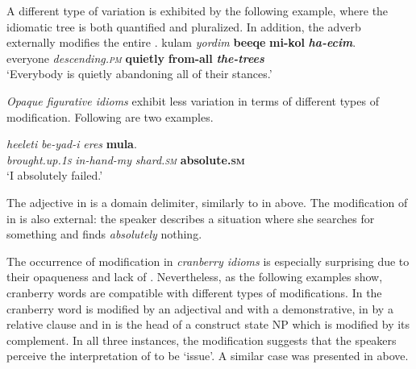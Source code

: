 \documentclass[output=paper]{langsci/langscibook}
\begin{document}
A different type of variation is exhibited by the following example, where the idiomatic tree is both quantified and pluralized. In addition, the adverb  externally modifies the entire .
    \ea\label{she:ec-ins-ext-mod-quant-plural}
        \gll kulam \textit{yordim} \textbf{be{\shinB}eqe{\tetB}} \textbf{mi-kol} \textit{\textbf{ha-{\ayinB}ecim}}.\\
            everyone \textit{descending.\textsc{pm}} \textbf{quietly} \textbf{from-all} \textit{\textbf{the-trees}}\\
        \glt `Everybody is quietly abandoning all of their stances.'
    \z

\textit{Opaque figurative idioms} exhibit less variation in terms of different types of modification. Following are two examples.

    \ea\label{she:xeres-ins-int-mod}
        \gll \textit{he{\ayin}eleti} \textit{be-yad-i} \textit{{\het}eres} \textbf{mu{\hetB}la{\tetB}}.\\
            \textit{brought.up.\textsc{1s}} \textit{ in-hand-my}  \textit{shard.\textsc{sm}}  \textbf{absolute.\textsc{sm}}  \\
        \glt `I absolutely failed.'
    \z

The adjective  in  is a domain delimiter, similarly to  in  above. The modification of  in  is also external: the speaker describes a situation where she searches for something and finds \emph{absolutely} nothing.

The occurrence of modification in \textit{cranberry idioms} is especially surprising due to their opaqueness and lack of . Nevertheless, as the following examples show, cranberry words are compatible with different types of modifications. In  the cranberry word  is modified by an adjectival  and with a demonstrative, in  by a relative clause and in   is the head of a construct state NP which is modified by its complement. In all three instances, the modification suggests that the speakers perceive the interpretation of  to be `issue'. A similar case was presented in  above.
\end{document}
